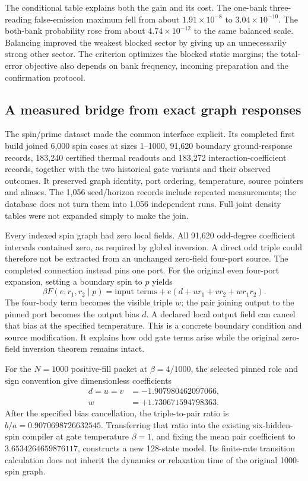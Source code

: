 The conditional table explains both the gain and its cost. The one-bank three-reading false-emission maximum fell from about $1.91\times10^{-8}$ to $3.04\times10^{-10}$. The both-bank probability rose from about $4.74\times10^{-12}$ to the same balanced scale. Balancing improved the weakest blocked sector by giving up an unnecessarily strong other sector. The criterion optimizes the blocked static margins; the total-error objective also depends on bank frequency, incoming preparation and the confirmation protocol.

\subsection{A measured bridge from exact graph responses}

The spin/prime dataset made the common interface explicit. Its completed first build joined 6,000 spin cases at sizes 1--1000, 91,620 boundary ground-response records, 183,240 certified thermal readouts and 183,272 interaction-coefficient records, together with the two historical gate variants and their observed outcomes. It preserved graph identity, port ordering, temperature, source pointers and aliases. The 1,056 seed/horizon records include repeated measurements; the database does not turn them into 1,056 independent runs. Full joint density tables were not expanded simply to make the join.

Every indexed spin graph had zero local fields. All 91,620 odd-degree coefficient intervals contained zero, as required by global inversion. A direct odd triple could therefore not be extracted from an unchanged zero-field four-port source. The completed connection instead pins one port. For the original even four-port expansion, setting a boundary spin to $p$ yields
\[
 \beta F(e,r_1,r_2\mid p)
 =\text{input terms}+e(d+ur_1+vr_2+wr_1r_2).
\]
The four-body term becomes the visible triple $w$; the pair joining output to the pinned port becomes the output bias $d$. A declared local output field can cancel that bias at the specified temperature. This is a concrete boundary condition and source modification. It explains how odd gate terms arise while the original zero-field inversion theorem remains intact.

For the $N=1000$ positive-fill packet at $\beta=4/1000$, the selected pinned role and sign convention give dimensionless coefficients
\begin{align*}
 d=u=v&=-1.907980462097066,\\
 w&=+1.730671594798363.
\end{align*}
After the specified bias cancellation, the triple-to-pair ratio is $b/a=0.9070698726632545$. Transferring that ratio into the existing six-hidden-spin compiler at gate temperature $\beta=1$, and fixing the mean pair coefficient to $3.6534264659876117$, constructs a new 128-state model. Its finite-rate transition calculation does not inherit the dynamics or relaxation time of the original 1000-spin graph.

